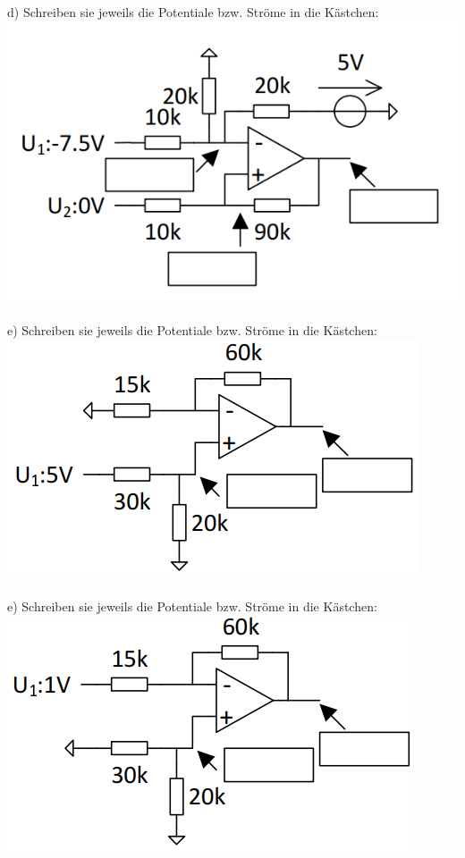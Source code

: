\documentclass[A4]{scrreprt}
\begin{document}
  d) Schreiben sie jeweils die Potentiale bzw. Ströme in die Kästchen:\\
  \includegraphics{Schaltung5.png}\\\\
  e) Schreiben sie jeweils die Potentiale bzw. Ströme in die Kästchen:\\
  \includegraphics{Schaltung9.png}\\\\
  e) Schreiben sie jeweils die Potentiale bzw. Ströme in die Kästchen:\\
  \includegraphics{Schaltung10.png}\\\\
\end{document}
